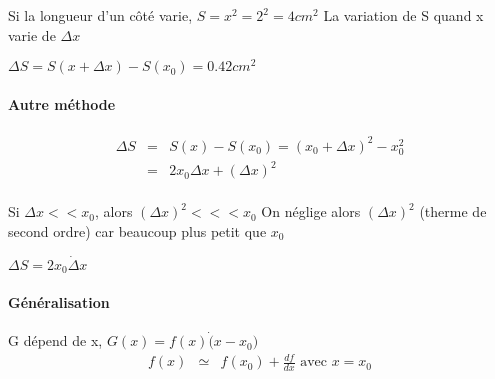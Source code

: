 Si la longueur d'un côté varie, $S = x^2 = 2^2 = 4cm^2$
La variation de S quand x varie de $\Delta x$

$\Delta S = S(x+\Delta x) - S(x_0) = 0.42 cm^2$

\paragraph{Autre méthode}
\begin{align*}
	\Delta S & = & S(x) - S(x_0) = (x_0 + \Delta x)^2 - x_0^2 \\
						 & = & 2x_0 \Delta x + (\Delta x)^2 \\
\end{align*}

Si $\Delta x << x_0$, alors $(\Delta x)^2 <<< x_0$ On néglige alors $(\Delta x)^2$ (therme de second ordre) car beaucoup plus petit que $x_0$

$\Delta S = 2x_0 \dot \Delta x$
\paragraph{Généralisation} G dépend de x, $G(x) = f(x) \dot (x-x_0)$
\begin{align*}
	f(x) & \simeq & f(x_0) + \frac{df}{dx} \text{ avec } x = x_0
\end{align*}
